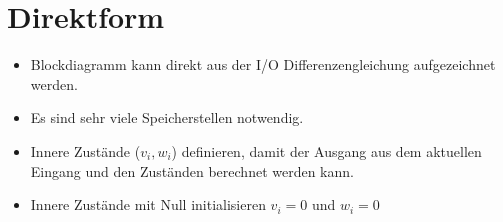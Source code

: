 % 
% 
% 
% 
%

\section{Direktform}  
	\begin{itemize}
	 \item Blockdiagramm kann direkt aus der I/O Differenzengleichung aufgezeichnet werden.\\[-0.6cm]
 	 \item Es sind sehr viele Speicherstellen notwendig.\\[-0.6cm]
	 \item Innere Zustände ($v_i,w_i$) definieren, damit der Ausgang aus dem aktuellen Eingang und den Zuständen berechnet werden kann. \\[-0.6cm]
	 \item Innere Zustände mit Null initialisieren $v_i = 0$ und $w_i = 0$
	\end{itemize}
